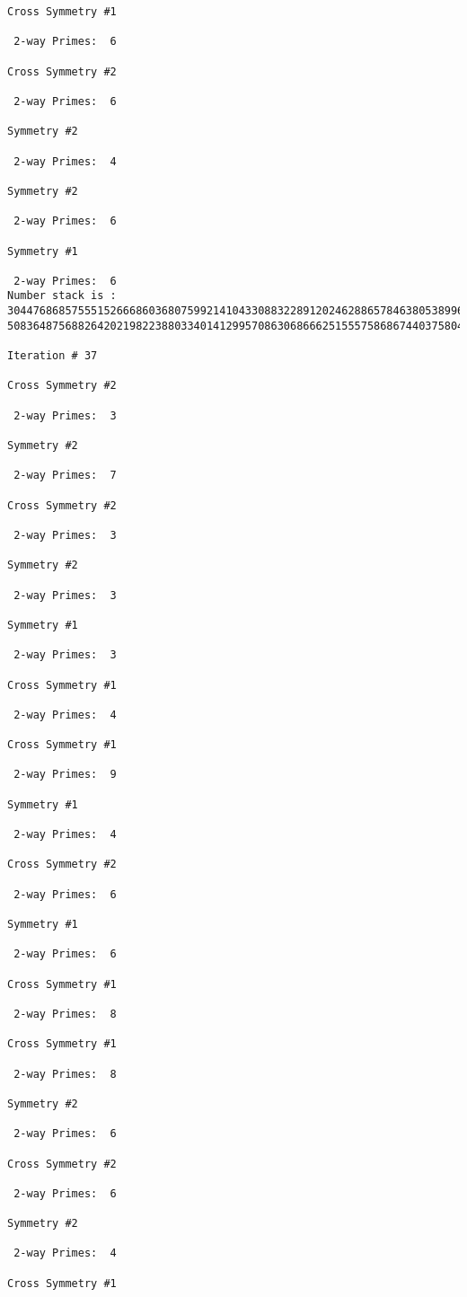 \begin{verbatim}
Cross Symmetry #1

 2-way Primes: 	6

Cross Symmetry #2

 2-way Primes: 	6

Symmetry #2

 2-way Primes: 	4

Symmetry #2

 2-way Primes: 	6

Symmetry #1

 2-way Primes: 	6
Number stack is :
30447686857555152666860368075992141043308832289120246288657846380538996794608835958544046240163340857
50836487568826420219822388033401412995708630686662515557586867440375804336104264044585953880649769983

Iteration #	37

Cross Symmetry #2

 2-way Primes: 	3

Symmetry #2

 2-way Primes: 	7

Cross Symmetry #2

 2-way Primes: 	3

Symmetry #2

 2-way Primes: 	3

Symmetry #1

 2-way Primes: 	3

Cross Symmetry #1

 2-way Primes: 	4

Cross Symmetry #1

 2-way Primes: 	9

Symmetry #1

 2-way Primes: 	4

Cross Symmetry #2

 2-way Primes: 	6

Symmetry #1

 2-way Primes: 	6

Cross Symmetry #1

 2-way Primes: 	8

Cross Symmetry #1

 2-way Primes: 	8

Symmetry #2

 2-way Primes: 	6

Cross Symmetry #2

 2-way Primes: 	6

Symmetry #2

 2-way Primes: 	4

Cross Symmetry #1


\end{verbatim}
